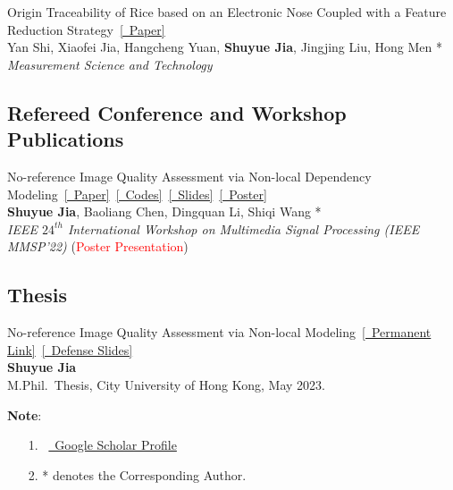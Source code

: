 \documentclass{my_cv}
\begin{document}
\hspace*{\fill}

\workitemsone
{Origin Traceability of Rice based on an Electronic Nose Coupled with a Feature Reduction Strategy~\href{https://iopscience.iop.org/article/10.1088/1361-6501/abb9e7/meta}{[\aiOpenAccess~Paper]} \\
Yan Shi, Xiaofei Jia, Hangcheng Yuan, \textbf{Shuyue Jia}, Jingjing Liu, Hong Men *\\
\emph{Measurement Science and Technology}
}

\hspace*{\fill}

\subsection{\textbf{Refereed Conference and Workshop Publications}}
\workitemsone
{No-reference Image Quality Assessment via Non-local Dependency Modeling~\href{https://ieeexplore.ieee.org/abstract/document/9950035}{[\aiIEEE~Paper]}~\href{https://github.com/SuperBruceJia/NLNet-IQA}{[\faGithub~Codes]}~\href{https://shuyuej.com/files/MMSP/MMSP22_Slides.pdf}{[\faFile~Slides]}~\href{https://shuyuej.com/files/MMSP/MMSP22_Poster.pdf}{[\faFile~Poster]}\\
\textbf{Shuyue Jia}, Baoliang Chen, Dingquan Li, Shiqi Wang *\\
\emph{IEEE $24^{th}$ International Workshop on Multimedia Signal Processing (IEEE MMSP'22)} (\textcolor{red}{Poster Presentation})
}

\hspace*{\fill}

\subsection{\textbf{Thesis}}
\workitemsone
{No-reference Image Quality Assessment via Non-local Modeling~\href{https://scholars.cityu.edu.hk/en/theses/noreference-image-quality-assessment-via-nonlocal-modeling(2d1e72fb-2405-43df-aac9-4838b6da1875).html}{[\faFile~Permanent Link]}~\href{https://shuyuej.com/files/Thesis/MPhil-Thesis-Defense-Presentation-ShuyueJia.pdf}{[\faFile~Defense Slides]}\\
\textbf{Shuyue Jia}\\
M.Phil.~Thesis, City University of Hong Kong, May 2023.
}

\hspace*{\fill}

\noindent\textbf{Note}:
\begin{itemize}
	\item [1.]~\href{https://scholar.google.com/citations?user=PfpEP60AAAAJ&hl=en}{\aiGoogleScholar~Google Scholar Proﬁle}
	\item [2.] * denotes the Corresponding Author.
\end{itemize}
\end{document}
